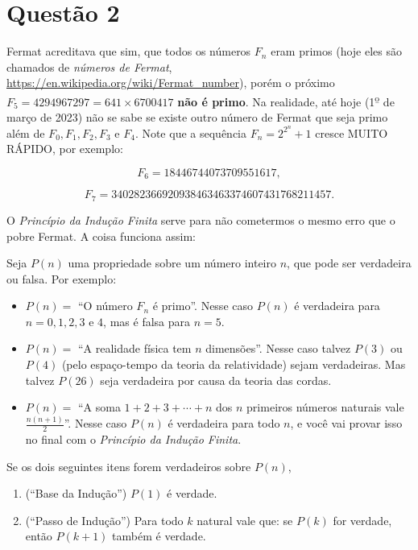 \documentclass[a4paper,fleqn,12pt]{article}
\begin{document}
\section{Questão 2}

Fermat acreditava que sim, que todos os números $F_n$ eram primos (hoje eles são chamados de \textit{números de Fermat}, \url{https://en.wikipedia.org/wiki/Fermat_number}), porém o próximo $F_5 = 4294967297 = 641 \times 6700417$ \textbf{não é primo}. Na realidade, até hoje (1\textsuperscript{\b{o}} de março de 2023) não se sabe se existe outro número de Fermat que seja primo além de $F_0, F_1, F_2, F_3$ e $F_4$. Note que a sequência $F_n = 2^{2^n} + 1$ cresce MUITO RÁPIDO, por exemplo:

$$ F_6 = 18446744073709551617, $$

$$ F_7 = 340282366920938463463374607431768211457. $$

\n\n


O \textit{Princípio da Indução Finita} serve para não cometermos o mesmo erro que o pobre Fermat. A coisa funciona assim:

\n

Seja $P(n)$ uma propriedade sobre um número inteiro $n$, que pode ser verdadeira ou falsa. Por exemplo:
\begin{itemize}
\item $P(n) =$ ``O número $F_n$ é primo''. Nesse caso $P(n)$ é verdadeira para $n = 0, 1, 2, 3$ e $4$, mas é falsa para $n = 5$.
\item $P(n) =$ ``A realidade física tem $n$ dimensões''. Nesse caso talvez $P(3)$ ou $P(4)$ (pelo espaço-tempo da teoria da relatividade) sejam verdadeiras. Mas talvez $P(26)$ seja verdadeira por causa da teoria das cordas.
\item $P(n) =$ ``A soma $1 + 2 + 3 + \cdots + n$ dos $n$ primeiros números naturais vale $\frac{n(n+1)}{2}$''. Nesse caso $P(n)$ é verdadeira para todo $n$, e você vai provar isso no final com o \textit{Princípio da Indução Finita}.
\end{itemize}

\n

Se os dois seguintes itens forem verdadeiros sobre $P(n)$,
\begin{enumerate}
\item (``Base da Indução'') $P(1)$ é verdade.
\item (``Passo de Indução'') Para todo $k$ natural vale que: se $P(k)$ for verdade, então $P(k+1)$ também é verdade.
\end{enumerate}
\end{document}
